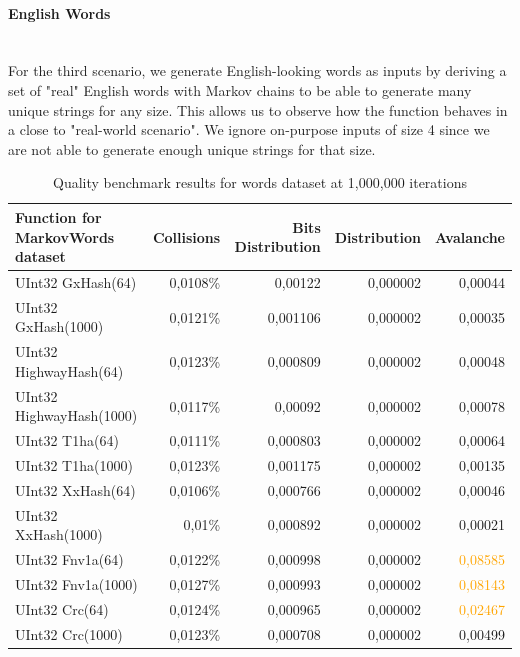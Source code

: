 \documentclass[10pt]{article}
\begin{document}
\clearpage
\paragraph{English Words}\leavevmode\\
For the third scenario, we generate English-looking words as inputs by deriving a set of "real" English words with Markov chains to be able to generate many unique strings for any size. This allows us to observe how the function behaves in a close to "real-world scenario". We ignore on-purpose inputs of size 4 since we are not able to generate enough unique strings for that size.

\begin{table}[H]
\centering
\begin{tabular}{|l|r|r|r|r|}
\hline
\textbf{Function for MarkovWords dataset} & \textbf{Collisions} & \textbf{Bits Distribution} & \textbf{Distribution} & \textbf{Avalanche} \\
\hline
UInt32 GxHash(64)                & 0,0108\% & 0,00122  & 0,000002 & 0,00044 \\
UInt32 GxHash(1000)              & 0,0121\% & 0,001106  & 0,000002 & 0,00035 \\
UInt32 HighwayHash(64)            & 0,0123\% & 0,000809  & 0,000002 & 0,00048 \\
UInt32 HighwayHash(1000)          & 0,0117\% & 0,00092   & 0,000002 & 0,00078 \\
UInt32 T1ha(64)                   & 0,0111\% & 0,000803  & 0,000002 & 0,00064 \\
UInt32 T1ha(1000)                 & 0,0123\% & 0,001175  & 0,000002 & 0,00135 \\
UInt32 XxHash(64)                & 0,0106\% & 0,000766  & 0,000002 & 0,00046 \\
UInt32 XxHash(1000)              & 0,01\%   & 0,000892  & 0,000002 & 0,00021 \\
UInt32 Fnv1a(64)                 & 0,0122\% & 0,000998  & 0,000002 & \textcolor{orange}{0,08585} \\
UInt32 Fnv1a(1000)               & 0,0127\% & 0,000993  & 0,000002 & \textcolor{orange}{0,08143} \\
UInt32 Crc(64)                   & 0,0124\% & 0,000965  & 0,000002 & \textcolor{orange}{0,02467} \\
UInt32 Crc(1000)                 & 0,0123\% & 0,000708  & 0,000002 & 0,00499 \\
\hline
\end{tabular}
\caption{Quality benchmark results for words dataset at 1,000,000 iterations}
\label{tab:my_label}
\end{table}
\end{document}
